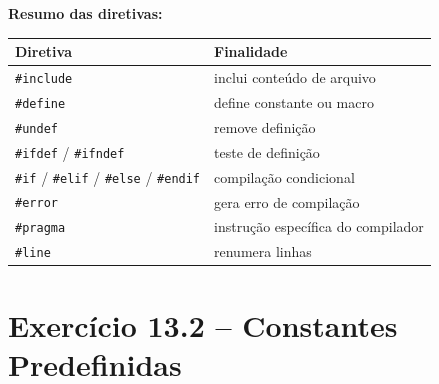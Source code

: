 \documentclass[12pt,a4paper]{article}
\begin{document}
\begin{respostabox}
\textbf{Resumo das diretivas:}
\begin{center}
\renewcommand{\arraystretch}{1.25}
\begin{tabular}{l l}
\toprule
\textbf{Diretiva} & \textbf{Finalidade} \\ \midrule
\texttt{\#include}   & inclui conteúdo de arquivo \\
\texttt{\#define}    & define constante ou macro \\
\texttt{\#undef}     & remove definição \\
\texttt{\#ifdef} / \texttt{\#ifndef} & teste de definição \\
\texttt{\#if} / \texttt{\#elif} / \texttt{\#else} / \texttt{\#endif} & compilação condicional \\
\texttt{\#error}     & gera erro de compilação \\
\texttt{\#pragma}    & instrução específica do compilador \\
\texttt{\#line}      & renumera linhas \\
\bottomrule
\end{tabular}
\end{center}
\end{respostabox}

\newpage

\section{Exercício 13.2 -- Constantes Predefinidas}
\end{document}
